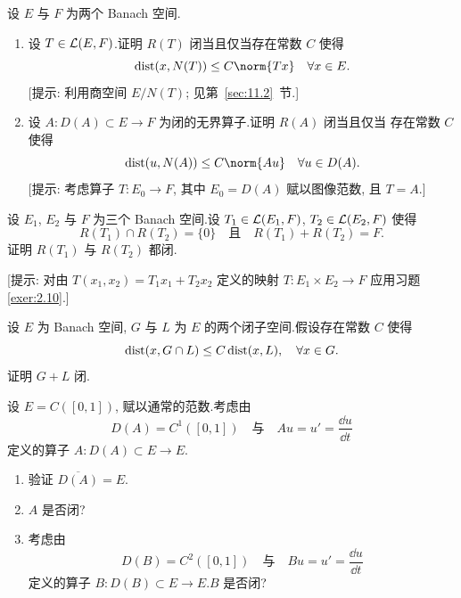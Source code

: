 \begin{exercise}
\label{exer:2.14}
设 $E$ 与 $F$ 为两个 Banach 空间.

\begin{enumerate}[label=\arabic*., leftmargin=2.2em, itemsep=0.25em]
	\item 设 $T\in\mathcal{L}(E,F)$.证明 $R(T)$ 闭当且仅当存在常数 $C$ 使得
	      \begin{equation*}
	      \dist(x,N(T))\le C\norm{Tx}\quad \forall x\in E.
	      \end{equation*}
	      [提示: 利用商空间 $E/N(T)$; 见第~\ref{sec:11.2}~节.]
	\item 设 $A:D(A)\subset E\to F$ 为闭的无界算子.证明 $R(A)$ 闭当且仅当
	      存在常数 $C$ 使得
	      \begin{equation*}
	      \dist(u,N(A))\le C\norm{Au}\quad \forall u\in D(A).
	      \end{equation*}
	      [提示: 考虑算子 $T:E_0\to F$, 其中 $E_0=D(A)$ 赋以图像范数, 且
	      $T=A$.]
\end{enumerate}
\end{exercise}

\begin{exercise}
\label{exer:2.15}
设 $E_1$, $E_2$ 与 $F$ 为三个 Banach 空间.设 $T_1\in\mathcal{L}(E_1,F)$,
$T_2\in\mathcal{L}(E_2,F)$ 使得
\begin{equation*}
R(T_1)\cap R(T_2)=\{0\}\quad\text{且}\quad R(T_1)+R(T_2)=F.
\end{equation*}
证明 $R(T_1)$ 与 $R(T_2)$ 都闭.

[提示: 对由 $T(x_1,x_2)=T_1x_1+T_2x_2$ 定义的映射
$T:E_1\times E_2\to F$ 应用习题  \ref{exer:2.10}.]
\end{exercise}

\begin{exercise}
\label{exer:2.16}
设 $E$ 为 Banach 空间, $G$ 与 $L$ 为 $E$ 的两个闭子空间.假设存在常数 $C$
使得
\begin{equation*}
\operatorname{dist}(x,G\cap L)\le C\operatorname{dist}(x,L),\quad \forall x\in G.
\end{equation*}
证明 $G+L$ 闭.
\end{exercise}

\begin{exercise}
\label{exer:2.17}
设 $E=C([0,1])$, 赋以通常的范数.考虑由
\begin{equation*}
D(A)=C^1([0,1])\quad\text{与}\quad Au=u'=\frac{\dd u}{\dd t}
\end{equation*}
定义的算子 $A:D(A)\subset E\to E$.

\begin{enumerate}[label=\arabic*., leftmargin=2.2em, itemsep=0.25em]
	\item 验证 $\overline{D(A)}=E$.
	\item $A$ 是否闭?
	\item 考虑由
	      \begin{equation*}
	      D(B)=C^2([0,1])\quad\text{与}\quad Bu=u'=\frac{\dd u}{\dd t}
	      \end{equation*}
	      定义的算子 $B:D(B)\subset E\to E$.$B$ 是否闭?
\end{enumerate}
\end{exercise}

